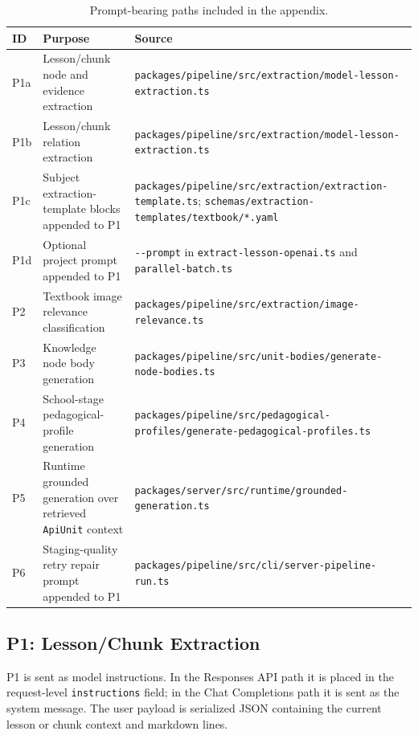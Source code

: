 \documentclass[11pt,letterpaper]{article}
\newcommand{\code}[1]{\nolinkurl{#1}}
\begin{document}
\begin{table}[H]
\centering
\small
\begin{tabularx}{\textwidth}{@{}p{}p{}Y@{}}
\toprule
ID & Purpose & Source\\
\midrule
P1a & Lesson/chunk node and evidence extraction & \code{packages/pipeline/src/extraction/model-lesson-extraction.ts}\\
P1b & Lesson/chunk relation extraction & \code{packages/pipeline/src/extraction/model-lesson-extraction.ts}\\
P1c & Subject extraction-template blocks appended to P1 & \code{packages/pipeline/src/extraction/extraction-template.ts}; \code{schemas/extraction-templates/textbook/*.yaml}\\
P1d & Optional project prompt appended to P1 & \code{--prompt} in \code{extract-lesson-openai.ts} and \code{parallel-batch.ts}\\
P2 & Textbook image relevance classification & \code{packages/pipeline/src/extraction/image-relevance.ts}\\
P3 & Knowledge node body generation & \code{packages/pipeline/src/unit-bodies/generate-node-bodies.ts}\\
P4 & School-stage pedagogical-profile generation & \code{packages/pipeline/src/pedagogical-profiles/generate-pedagogical-profiles.ts}\\
P5 & Runtime grounded generation over retrieved \code{ApiUnit} context & \code{packages/server/src/runtime/grounded-generation.ts}\\
P6 & Staging-quality retry repair prompt appended to P1 & \code{packages/pipeline/src/cli/server-pipeline-run.ts}\\
\bottomrule
\end{tabularx}
\caption{Prompt-bearing paths included in the appendix.}
\label{tab:prompt-inventory}
\end{table}

\subsection{P1: Lesson/Chunk Extraction}

P1 is sent as model instructions. In the Responses API path it is placed in the request-level \code{instructions} field; in the Chat Completions path it is sent as the system message. The user payload is serialized JSON containing the current lesson or chunk context and markdown lines.
\end{document}
